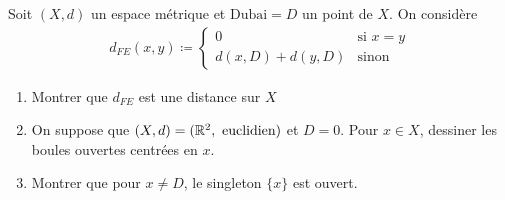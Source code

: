 \documentclass[french,a4paper,10pt]{article}
\begin{document}
	\medspace
	\begin{td-exo}
		Soit $(X, d)$ un espace métrique et $\text{Dubai}=D$ un point de $X$. On considère
		\[\begin{aligned}
			d_{FE}(x, y)\coloneq\begin{cases}
				0&\text{si }x=y\\
				d(x, D)+d(y, D)&\text{sinon}
			\end{cases}
		\end{aligned}\]
		
		\begin{enumerate}
			\item Montrer que $d_{FE}$ est une distance sur $X$
			\item On suppose que $(X, d)=(\mathbb{R}^2, \text{ euclidien})$ et $D=0$. Pour $x\in X$, dessiner les boules ouvertes centrées en $x$.
			\item Montrer que pour $x\ne D$, le singleton $\{x\}$ est ouvert.
		\end{enumerate}
	\end{td-exo}
\end{document}
